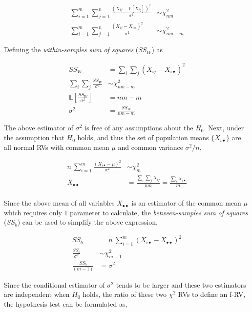 \begin{align}
	\sum\limits_{i = 1}^{m} \sum\limits_{j = 1}^{n} \frac{(X_{ij} - \mathbb{E}[X_{ij}])^2}{\sigma^2} &\sim \chi^2_{nm} \\
	\sum\limits_{i = 1}^{m} \sum\limits_{j = 1}^{n} \frac{(X_{ij} - X_{i\bullet})^2}{\sigma^2} &\sim \chi^2_{nm - m} 
\end{align}

Defining the \textit{within-samples sum of squares} ($ SS_W $) as 

\begin{align}
	SS_W &= \sum_{i} \sum_{j} (X_{ij} - X_{i\bullet})^2 \\
	\sum_{i} \sum_{j} \frac{SS_W}{\sigma^2} &\sim \chi^2_{nm-m} \\
	\mathbb{E}\left[\frac{SS_W}{\sigma^2}\right] &= nm - m \\
	\sigma^2 &= \frac{SS_W}{nm-m}
\end{align}

The above estimator of $ \sigma^2 $ is free of any assumptions about the $ H_0 $. Next, under the assumption that $ H_0 $ holds, and thus the set of population means $ \{X_{i\bullet}\} $ are all normal RVs with common mean $ \mu $ and common variance $ \sigma^2 / n $,

\begin{align}
	n\ \sum\limits_{i = 1}^{m} \frac{(X_{i\bullet} - \mu)^2}{\sigma^2} &\sim \chi^2_{m} \\
	X_{\bullet \bullet} &= \frac{\sum_{i} \sum_{j} X_{ij}}{nm} = \frac{\sum_{i} X_{i\bullet}}{m} \\
\end{align}

Since the above mean of all variables $ X_{\bullet \bullet} $ is an estimator of the common mean $ \mu $ which requires only $ 1 $ parameter to calculate, the \textit{between-samples sum of squares} ($ SS_b $) can be used to simplify the above expression,

\begin{align}
	SS_b &= n\ \sum\limits_{i = 1}^{m} (X_{i\bullet} - X_{\bullet\bullet})^2 \\
	\frac{SS_b}{\sigma^2} &\sim \chi^2_{m-1} \nonumber \\
	\frac{SS_b}{(m-1)} &= \sigma^2
\end{align}

Since the conditional estimator of $ \sigma^2 $ tends to be larger and these two estimators are independent when $ H_0 $ holds, the ratio of these two $ \chi^2 $ RVs to define an f-RV, the hypothesis test can be formulated as,

